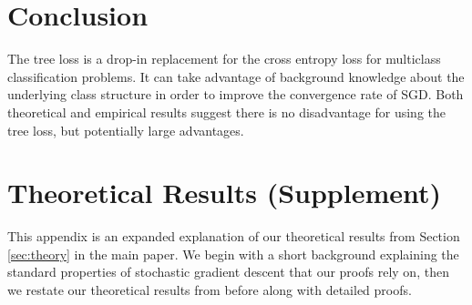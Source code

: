 \documentclass[twoside]{article}
\begin{document}
\section{Conclusion}
The tree loss is a drop-in replacement for the cross entropy loss for multiclass classification problems.
It can take advantage of background knowledge about the underlying class structure in order to improve the convergence rate of SGD.
Both theoretical and empirical results suggest there is no disadvantage for using the tree loss,
but potentially large advantages.







\clearpage
\appendix

\setcounter{lemma}{0}
\setcounter{assumption}{0}
\setcounter{corollary}{0}
\setcounter{theorem}{0}

\section{Theoretical Results (Supplement)}
\label{appendix:theory}

This appendix is an expanded explanation of our theoretical results from Section \ref{sec:theory} in the main paper.
We begin with a short background explaining the standard properties of stochastic gradient descent that our proofs rely on,
then we restate our theoretical results from before along with detailed proofs.
\end{document}
